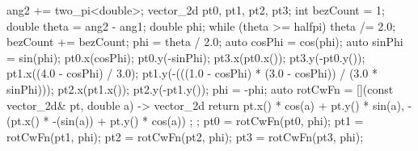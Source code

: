 \begin{codeblock}
{{{{          ang2 += two_pi<double>;
        }
        vector_2d pt0, pt1, pt2, pt3;
        int bezCount = 1;
        double theta = ang2 - ang1;
        double phi;
        while (theta >= halfpi) {
          theta /= 2.0;
          bezCount += bezCount;
        }
        phi = theta / 2.0;
        auto cosPhi = cos(phi);
        auto sinPhi = sin(phi);
        pt0.x(cosPhi);
        pt0.y(-sinPhi);
        pt3.x(pt0.x());
        pt3.y(-pt0.y());
        pt1.x((4.0 - cosPhi) / 3.0);
        pt1.y(-(((1.0 - cosPhi) * (3.0 - cosPhi)) / (3.0 * sinPhi)));
        pt2.x(pt1.x());
        pt2.y(-pt1.y());
        phi = -phi;
        auto rotCwFn = [](const vector_2d& pt, double a) -> vector_2d {
          return { pt.x() * cos(a) + pt.y() * sin(a),
            -(pt.x() * -(sin(a)) + pt.y() * cos(a)) };
        };
        pt0 = rotCwFn(pt0, phi);
        pt1 = rotCwFn(pt1, phi);
        pt2 = rotCwFn(pt2, phi);
        pt3 = rotCwFn(pt3, phi);
        
}}}
\end{codeblock}
